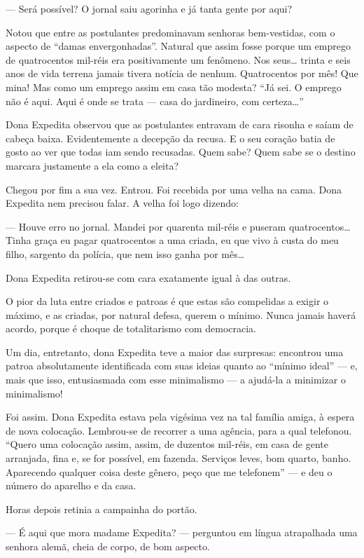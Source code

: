 --- Será possível? O jornal saiu agorinha e já tanta gente por aqui?

Notou que entre as postulantes predominavam senhoras bem-vestidas, com o
aspecto de ``damas envergonhadas''. Natural que assim fosse porque um
emprego de quatrocentos mil-réis era positivamente um fenômeno. Nos
seus\ldots{} trinta e seis anos de vida terrena jamais tivera notícia de
nenhum. Quatrocentos por mês! Que mina! Mas como um emprego assim em
casa tão modesta? ``Já sei. O emprego não é aqui. Aqui é onde se trata
--- casa do jardineiro, com certeza\ldots{}''

Dona Expedita observou que as postulantes entravam de cara risonha e
saíam de cabeça baixa. Evidentemente a decepção da recusa. E o seu
coração batia de gosto ao ver que todas iam sendo recusadas. Quem sabe?
Quem sabe se o destino marcara justamente a ela como a eleita?

Chegou por fim a sua vez. Entrou. Foi recebida por uma velha na cama.
Dona Expedita nem precisou falar. A velha foi logo dizendo:

--- Houve erro no jornal. Mandei por quarenta mil-réis e puseram
quatrocentos\ldots{} Tinha graça eu pagar quatrocentos a uma criada, eu que
vivo à custa do meu filho, sargento da polícia, que nem isso ganha por
mês\ldots{}

Dona Expedita retirou-se com cara exatamente igual à das outras.

O pior da luta entre criados e patroas é que estas são compelidas a
exigir o máximo, e as criadas, por natural defesa, querem o mínimo.
Nunca jamais haverá acordo, porque é choque de totalitarismo com
democracia.

Um dia, entretanto, dona Expedita teve a maior das surpresas: encontrou
uma patroa absolutamente identificada com suas ideias quanto ao ``mínimo
ideal'' --- e, mais que isso, entusiasmada com esse minimalismo --- a
ajudá-la a minimizar o minimalismo!

Foi assim. Dona Expedita estava pela vigésima vez na tal família amiga,
à espera de nova colocação. Lembrou-se de recorrer a uma agência, para a
qual telefonou. ``Quero uma colocação assim, assim, de duzentos
mil-réis, em casa de gente arranjada, fina e, se for possível, em
fazenda. Serviços leves, bom quarto, banho. Aparecendo qualquer coisa
deste gênero, peço que me telefonem'' --- e deu o número do aparelho e
da casa.

Horas depois retinia a campainha do portão.

--- É aqui que mora madame Expedita? --- perguntou em língua atrapalhada
uma senhora alemã, cheia de corpo, de bom aspecto.

